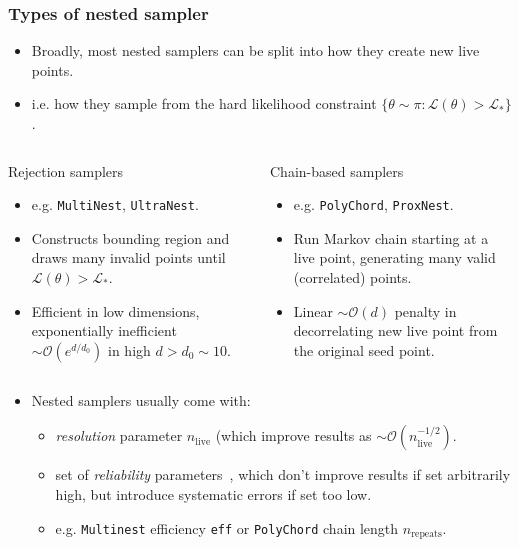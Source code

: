 \documentclass[aspectratio=169]{beamer}
\begin{document}
\begin{frame}
    \frametitle{Types of nested sampler}
    \begin{itemize}
        \item Broadly, most nested samplers can be split into how they create new live points.
        \item i.e. how they sample from the hard likelihood constraint $\{\theta\sim \pi : \mathcal{L}(\theta)>\mathcal{L}_* \}$.
    \end{itemize}
    \vspace{-10pt}
    \begin{columns}[t]
        \begin{block}{Rejection samplers}
            \begin{itemize}
                \item e.g. \texttt{MultiNest}, \texttt{UltraNest}.
\item Constructs bounding region and draws many invalid points until $\mathcal{L}(\theta)>\mathcal{L}_*$.
                \item Efficient in low dimensions, exponentially inefficient $\sim\mathcal{O}(e^{d/d_0})$ in high  $d>d_0\sim10$.
            \end{itemize}
        \end{block}
        \begin{block}{Chain-based samplers}
            \begin{itemize}
                \item e.g. \texttt{PolyChord}, \texttt{ProxNest}.
                \item Run Markov chain starting at a live point, generating many valid (correlated) points.
                \item Linear $\sim\mathcal{O}(d)$ penalty in decorrelating new live point from the original seed point.
            \end{itemize}
        \end{block}
    \end{columns}
    \vspace{5pt}
    \begin{itemize}
        \item Nested samplers usually come with:
            \begin{itemize}
                \item \emph{resolution} parameter $n_\mathrm{live}$ (which improve results as $\sim\mathcal{O}(n_\mathrm{live}^{-1/2})$.
                    \item set of \emph{reliability} parameters~, which don't improve results if set arbitrarily high, but introduce systematic errors if set too low.
                    \item e.g. \texttt{Multinest} efficiency \texttt{eff} or \texttt{PolyChord} chain length $n_\mathrm{repeats}$.
            \end{itemize}
    \end{itemize}
\end{frame}
\end{document}
